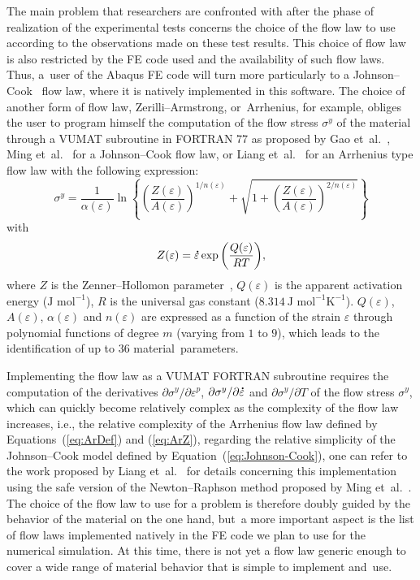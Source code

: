 \documentclass[algorithms,article,accept,pdftex,moreauthors]{Definitions/mdpi}
\makeatletter
\DeclareRobustCommand{\mdot}[1]{\accentset{\mbox{\bfseries .}}{#1}}
\DeclareRobustCommand{\ie}{{i.e.,}\@\xspace}
\makeatother
\begin{document}
The main problem that researchers are confronted with after the phase of realization of the experimental tests concerns the choice of the flow law to use according to the observations made on these test results.
This choice of flow law is also restricted by the FE code used and the availability of such flow laws.
Thus, a~user of the Abaqus FE code will turn more particularly to a Johnson--Cook~\cite{Johnson-1983} flow law, where it is natively implemented in this software.
The choice of another form of flow law, Zerilli--Armstrong, or~Arrhenius, for example, obliges the user to program himself the computation of the flow stress $\sigma^y$ of the material through a VUMAT subroutine in FORTRAN 77 as proposed by Gao et~al.~\cite{Gao-2007-FRT}, Ming et~al.~\cite{Ming-2018} for a Johnson--Cook flow law, or Liang et~al.~\cite{Liang-2022} for an Arrhenius type flow law with the following expression:
\begin{equation}
\sigma^y = \frac{1}{\alpha(\varepsilon)} \ln\left\{\left(\frac{Z(\varepsilon)}{A(\varepsilon)}\right)^{1/n(\varepsilon)} + \sqrt{1 + \left(\frac{Z(\varepsilon)}{A(\varepsilon)}\right)^{2/n(\varepsilon)}}\right\}
\label{eq:ArDef}
\end{equation}
with
\begin{equation}
Z(\varepsilon) = \mdot\varepsilon \exp{\left(\frac{Q(\varepsilon)}{RT}\right)}, \label{eq:ArZ}
\end{equation}
where $Z$ is the Zenner--Hollomon parameter~\cite{Zener-1944}, $Q(\varepsilon)$ is the apparent activation energy ($\text{J~mol}^{-1}$), $R$ is the universal gas constant ($8.314~\text{J~mol}^{-1} \text{K}^{-1}$).
$Q(\varepsilon)$, $A(\varepsilon)$, $\alpha(\varepsilon)$ and $n(\varepsilon)$ are expressed as a function of the strain $\varepsilon$ through polynomial functions of degree $m$ (varying from $1$ to $9$), which leads to the identification of up to $36$ material~parameters.

Implementing the flow law as a VUMAT FORTRAN subroutine requires the computation of the derivatives  $\partial\sigma^y/\partial\varepsilon^p$, $\partial\sigma^y/\partial\mdot\varepsilon$ and $\partial\sigma^y/\partial T$ of the flow stress $\sigma^y$, which can quickly become relatively complex as the complexity of the flow law increases, \ie the relative complexity of the Arrhenius flow law defined by Equations~(\ref{eq:ArDef}) and (\ref{eq:ArZ}), regarding the relative simplicity of the Johnson--Cook model defined by Equation~(\ref{eq:Johnson-Cook}), one can refer to the work proposed by Liang et~al.~\cite{Liang-2022} for details concerning this implementation using the safe version of the Newton--Raphson method proposed by Ming et~al.~\cite{Ming-2018}.
The choice of the flow law to use for a problem is therefore doubly guided by the behavior of the material on the one hand, but~a more important aspect is the list of flow laws implemented natively in the FE code we plan to use for the numerical simulation.
At this time, there is not yet a flow law generic enough to cover a wide range of material behavior that is simple to implement and~use.
\end{document}
